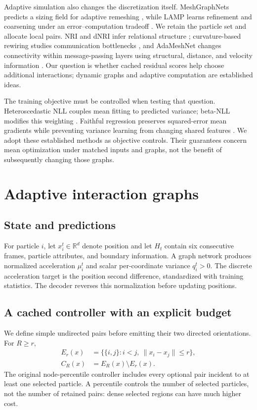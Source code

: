 Adaptive simulation also changes the discretization itself. MeshGraphNets predicts a sizing field for adaptive remeshing \citep{pfaff2021}, while LAMP learns refinement and coarsening under an error--computation tradeoff \citep{wu2023}. We retain the particle set and allocate local pairs. NRI and dNRI infer relational structure \citep{kipf2018,graber2020}; curvature-based rewiring studies communication bottlenecks \citep{topping2022}, and AdaMeshNet changes connectivity within message-passing layers using structural, distance, and velocity information \citep{seo2025}. Our question is whether cached residual scores help choose additional interactions; dynamic graphs and adaptive computation are established ideas.

The training objective must be controlled when testing that question. Heteroscedastic NLL couples mean fitting to predicted variance; beta-NLL modifies this weighting \citep{seitzer2022}. Faithful regression preserves squared-error mean gradients while preventing variance learning from changing shared features \citep{stirn2023}. We adopt these established methods as objective controls. Their guarantees concern mean optimization under matched inputs and graphs, not the benefit of subsequently changing those graphs.

\section{Adaptive interaction graphs}
\subsection{State and predictions}
For particle $i$, let $x_i^t\in\mathbb R^d$ denote position and let $H_t$ contain six consecutive frames, particle attributes, and boundary information. A graph network produces normalized acceleration $\mu_i^t$ and scalar per-coordinate variance $q_i^t>0$. The discrete acceleration target is the position second difference, standardized with training statistics. The decoder reverses this normalization before updating positions.

\subsection{A cached controller with an explicit budget}
We define simple undirected pairs before emitting their two directed orientations. For $R\ge r$,
\begin{align}
 E_r(x)&=\{\{i,j\}:i<j,\ \|x_i-x_j\|\le r\},\nonumber\\
 C_R(x)&=E_R(x)\setminus E_r(x).
\end{align}
The original node-percentile controller includes every optional pair incident to at least one selected particle. A percentile controls the number of selected particles, not the number of retained pairs: dense selected regions can have much higher cost.

